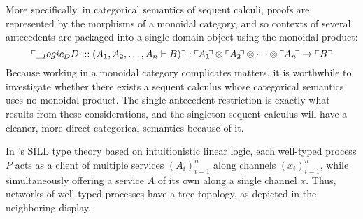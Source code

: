 \begin{description}[parsep=0pt, listparindent=\parindent]
  More specifically, in categorical semantics of sequent calculi, proofs are represented by the morphisms of a monoidal category, and so contexts of several antecedents are packaged into a single domain object using the monoidal product:
  \begin{equation*}
    \ulcorner \DD :: (A_1, A_2, \dotsc, A_n \vdash B) \urcorner :
      \ulcorner\mkern-1mu A_1 \mkern-\thinmuskip\urcorner \otimes \ulcorner\mkern-1mu A_2 \mkern-\thinmuskip\urcorner \otimes \dotsb \otimes \ulcorner\mkern-1mu A_n \mkern-\thinmuskip\urcorner \to \ulcorner B \urcorner
  \end{equation*}
  Because working in a monoidal category complicates matters, it is worthwhile to investigate whether there exists a sequent calculus whose categorical semantics uses no monoidal product.
  The single-antecedent restriction is exactly what results from these considerations, and the singleton sequent calculus will have a cleaner, more direct categorical semantics because of it.

\item[Type theory]
  In \citeauthor{Caires+:MSCS16}'s \acs{SILL} type theory\autocites{Caires+Pfenning:CONCUR10}{Caires+:TLDI12}{Toninho+:ESOP13}{Caires+:MSCS16} based on intuitionistic linear logic, each well-typed process $P$ acts as a client of multiple services $(A_i)_{i=1}^n$ along channels $(x_i)_{i=1}^n$, while simultaneously offering a service $A$ of its own along a single channel $x$.
  Thus, networks of well-typed processes have a tree topology, as depicted in the neighboring display.%


\end{description}
